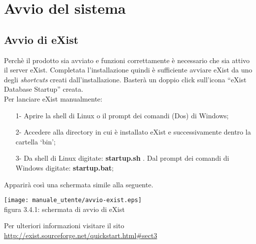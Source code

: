 \chapter{Avvio del sistema}
\section{Avvio di eXist}
Perch\`e il prodotto sia avviato e funzioni correttamente \`e necessario che sia attivo il server eXist. Completata l'installazione quindi è sufficiente avviare eXist da uno degli \textit{shortcuts} creati dall'installazione. Baster\`a un doppio click sull'icona ``eXist Database Startup'' creata.\\
Per lanciare eXist manualmente:
\begin{itemize}
\item[1-] Aprire la shell di Linux o il prompt dei comandi (Dos) di Windows;
\item[2-] Accedere alla directory in cui \`e installato eXist e successivamente dentro la cartella `bin';
\item[3-] Da shell di Linux digitate:  \textbf{startup.sh} . Dal prompt dei comandi di Windows digitate: \textbf{startup.bat};
\end{itemize}	
Apparir\`a cos\`i una schermata simile alla seguente.
\begin{center}
\texttt{[image: manuale\_utente/avvio-exist.eps]}\\
figura 3.4.1: schermata di avvio di eXist
\end{center}
Per ulteriori informazioni visitare il sito\\
 \href{http://exist.sourceforge.net/quickstart.html\#sect3}{ http://exist.sourceforge.net/quickstart.html\#sect3}


